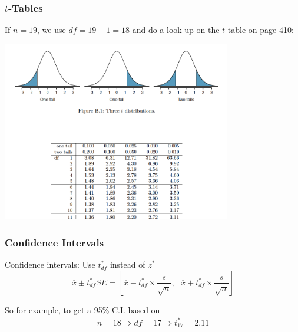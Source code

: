 \documentclass[handout]{beamer}
\newcommand{\xbar}{\overline{x}}
\begin{document}
\begin{frame}
\frametitle{$t$-Tables}
If $n=19$, we use $df=19-1=18$ and do a look up on the $t$-table on page 410:

\begin{center}
\includegraphics[width=0.75\textwidth]{figure/t.png}
\end{center}

\end{frame}


\begin{frame}
\frametitle{Confidence Intervals}

Confidence intervals:  Use $t^*_{df}$ instead of $z^*$
\[
\xbar \pm t_{df}^* SE = 
\left[
\overline{x} - t_{df}^* \times\frac{s}{\sqrt n}, \mbox{  }
\overline{x} + t_{df}^* \times\frac{s}{\sqrt n}
\right]
\]

So for example, to get a 95\% C.I. based on
\begin{eqnarray*}
n=18 \Rightarrow df=17 \Rightarrow t_{17}^*=2.11
\end{eqnarray*}

\end{frame}
\end{document}

